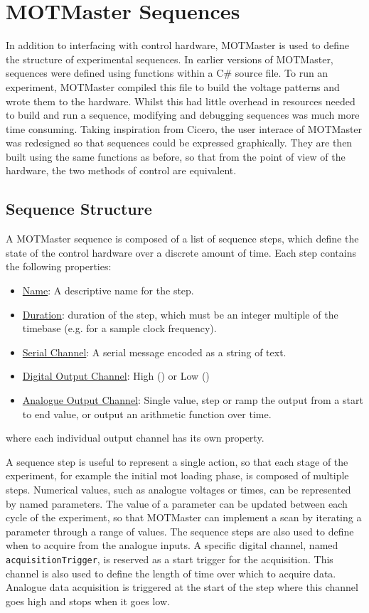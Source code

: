 \section{MOTMaster Sequences}\label{sec:mm_sequences}
In addition to interfacing with control hardware, MOTMaster is used to define
the structure of experimental sequences. In earlier versions of MOTMaster,
sequences were defined using functions within a C\# source file. To run an
experiment, MOTMaster compiled this file to build the voltage patterns and
wrote them to the hardware. Whilst this had little overhead in resources
needed to build and run a sequence, modifying and debugging sequences was
much more time consuming. Taking inspiration from Cicero, the user interace
of MOTMaster was redesigned so that sequences could be expressed graphically.
They are then built using the same functions as before, so that from the
point of view of the hardware, the two methods of control are equivalent. 

\subsection{Sequence Structure}
A MOTMaster sequence is composed of a list of sequence steps, which define
the state of the control hardware over a discrete amount of time. Each step
contains the following properties:
\begin{itemize}
    \item \underline{Name}: A descriptive name for the step.
    \item \underline{Duration}: duration of the step, which must be an integer multiple of the timebase (e.g.  for a 
    sample clock frequency).
    \item \underline{Serial Channel}: A serial message encoded as a string of text.
    \item \underline{Digital Output Channel}: High () or Low ()
    \item \underline{Analogue Output Channel}: Single value, step or ramp the output from a start to end value, or output an arithmetic function over time.
\end{itemize}
where each individual output channel has its own property.
\par\noindent
A sequence step is useful to represent a single action, so that each
stage of the experiment, for example the initial \ac{mot} loading phase, is
composed of multiple steps. Numerical values, such as analogue voltages or
times, can be represented by named parameters. The value of a parameter can
be updated between each cycle of the experiment, so that MOTMaster can
implement a scan by iterating a parameter through a range of values. The sequence steps are also used to
define when to acquire from the analogue inputs. A specific digital channel,
named \verb|acquisitionTrigger|, is reserved as a start trigger for the
acquisition. This channel is also used to define the length of time over which to acquire data. Analogue data acquisition is triggered at the start of the step where this channel goes high and stops when it goes low. 
